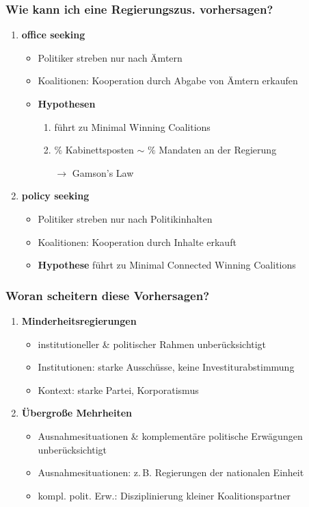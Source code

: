 \documentclass{beamer}
\begin{document}
\begin{frame}
  \frametitle{Wie kann ich eine Regierungszus. vorhersagen?}
  \begin{enumerate}
    \item \textbf{office seeking}
    \begin{itemize}
      \item Politiker streben nur nach Ämtern
      \item Koalitionen: Kooperation durch Abgabe von Ämtern erkaufen
      \item \textbf{Hypothesen}
      \begin{enumerate}
        \item führt zu Minimal Winning Coalitions
        \item $\%$ Kabinettsposten $\sim$ $\%$ Mandaten an der Regierung
        \item [$\rightarrow$] Gamson's Law
      \end{enumerate}
    \end{itemize}
    \item \textbf{policy seeking}
    \begin{itemize}
      \item Politiker streben nur nach Politikinhalten
      \item Koalitionen: Kooperation durch Inhalte erkauft
      \item \textbf{Hypothese} führt zu Minimal Connected Winning Coalitions
    \end{itemize}
  \end{enumerate}
\end{frame}

\begin{frame}
  \frametitle{Woran scheitern diese Vorhersagen?}
  \begin{enumerate}
    \item \textbf{Minderheitsregierungen}
    \begin{itemize}
      \item institutioneller \& politischer Rahmen unberücksichtigt
      \item Institutionen: starke Ausschüsse, keine Investiturabstimmung
      \item Kontext: starke Partei, Korporatismus
    \end{itemize}
    \item \textbf{Übergroße Mehrheiten}
    \begin{itemize}
      \item Ausnahmesituationen \& komplementäre politische Erwägungen unberücksichtigt
      \item Ausnahmesituationen: z.\,B. Regierungen der nationalen Einheit
      \item kompl. polit. Erw.: Disziplinierung kleiner Koalitionspartner
    \end{itemize}
  \end{enumerate}
\end{frame}
\end{document}
